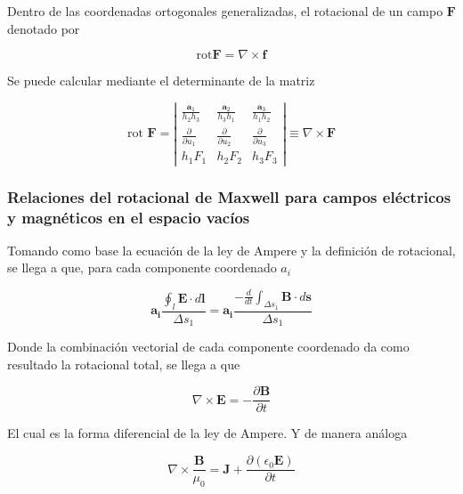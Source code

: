 Dentro de las coordenadas ortogonales generalizadas, el rotacional de un campo $\mathbf{F}$ denotado por 

\begin{equation*}
\text{rot} \mathbf{F} = \nabla \times \mathbf{f}
\end{equation*}

Se puede calcular mediante el determinante de la matriz

\begin{equation*}
\text{rot } \mathbf{F} = 
\left|
\begin{matrix}
    \frac{ \mathbf{a}_1 }{h_2  h_3  } & \frac{ \mathbf{a}_2 }{h_3  h_1  } & \frac{ \mathbf{a}_3 }{h_1  h_2  } \\
    \frac{\partial }{\partial u_1} & \frac{\partial }{\partial u_2} & \frac{\partial }{\partial u_3} \\
    h_1 F_1 & h_2 F_2 & h_3 F_3 
\end{matrix}
\right| \equiv \nabla \times \mathbf{F}
\end{equation*}

\subsubsection{Relaciones del rotacional de Maxwell para campos eléctricos y magnéticos en el espacio vacíos}

Tomando como base la ecuación de la ley de Ampere y la definición de rotacional, se llega a que, para cada componente coordenado $a_i$

\begin{equation*}
\mathbf{a_i} \frac{\oint_l \mathbf{E} \cdot d \mathbf{l} }{\Delta s_1} = \mathbf{a_i} \frac{-\frac{d}{dt}\int_{\Delta s_1} \mathbf{B} \cdot d \mathbf{s}}{\Delta s_1}
\end{equation*}

Donde la combinación vectorial de cada componente coordenado da como resultado la rotacional total, se llega a que

\begin{equation*}
\nabla \times \mathbf{E} = - \frac{\partial \mathbf{B}}{\partial t}
\end{equation*}

El cual es la forma diferencial de la ley de Ampere. Y de manera análoga

\begin{equation*}
\nabla \times \frac{\mathbf{B}}{\mu_0} = \mathbf{J} + \frac{\partial (\epsilon_0 \mathbf{E}) }{\partial t}
\end{equation*}

























